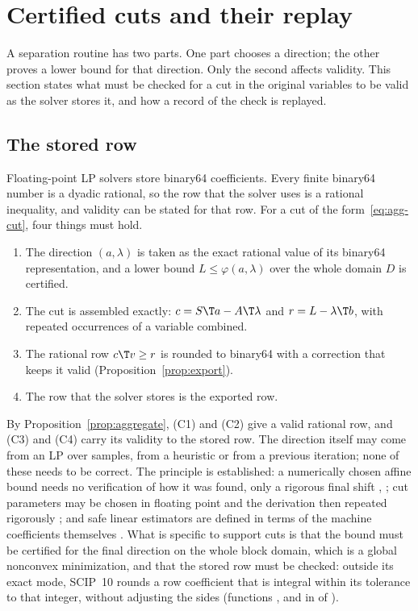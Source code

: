 \section{Certified cuts and their replay}\label{sec:certification}

A separation routine has two parts. One part chooses a direction; the other
proves a lower bound for that direction. Only the second affects validity.
This section states what must be checked for a cut in the original variables
to be valid as the solver stores it, and how a record of the check is
replayed.

\subsection{The stored row}\label{sec:exported-row}

Floating-point LP solvers store binary64 coefficients. Every finite binary64
number is a dyadic rational, so the row that the solver uses is a rational
inequality, and validity can be stated for that row. For a cut of the
form~\eqref{eq:agg-cut}, four things must hold.
\begin{enumerate}[label=(C\arabic*)]
\item The direction $(a,\lambda)$ is taken as the exact rational value of its
binary64 representation, and a lower bound $L\le\varphi(a,\lambda)$ over the
whole domain $D$ is certified.
\item The cut is assembled exactly: $c=S\T a-A\T\lambda$ and $r=L-\lambda\T b$,
with repeated occurrences of a variable combined.
\item The rational row $c\T v\ge r$ is rounded to binary64 with a correction
that keeps it valid (Proposition~\ref{prop:export}).
\item The row that the solver stores is the exported row.
\end{enumerate}
By Proposition~\ref{prop:aggregate}, (C1) and (C2) give a valid rational row,
and (C3) and (C4) carry its validity to the stored row. The direction itself
may come from an LP over samples, from a heuristic or from a previous
iteration; none of these needs to be correct. The principle is established:
a numerically chosen affine bound needs no verification of how it was found,
only a rigorous final shift \citep[Section~5]{GarloffJanssonSmith2003JCAM},
\citep{GarloffSmith2008}; cut parameters may be chosen in floating point and
the derivation then repeated rigorously
\citep[p.~294]{NeumaierShcherbina2004}; and safe linear estimators are
defined in terms of the machine coefficients themselves
\citep{BorradaileVanHentenryck2005}. What is specific to support cuts is that
the bound must be certified for the final direction on the whole block
domain, which is a global nonconvex minimization, and that the stored row
must be checked: outside its exact mode, SCIP~10 rounds a row coefficient
that is integral within its tolerance to that integer, without adjusting the
sides (functions ,  and
 in  of \citealp{SCIPsource10}).

